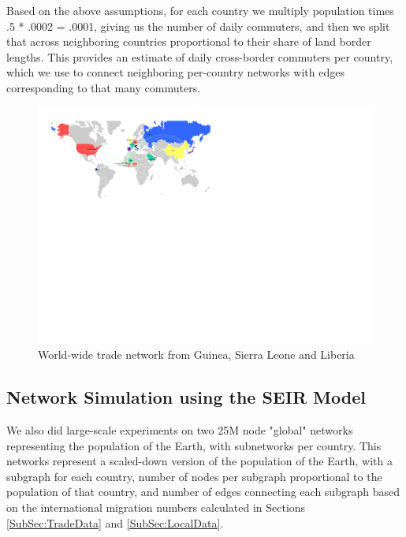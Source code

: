 \documentclass[10pt, journal,onecolumn]{IEEEtran}
\begin{document}
Based on the above assumptions, for each country we multiply population times .5 * .0002
= .0001, giving us the number of daily commuters, and then we split that across neighboring
countries proportional to their share of land border lengths. This provides an estimate
of daily cross-border commuters per country, which we use to connect neighboring per-country
networks with edges corresponding to that many commuters.


\begin{figure}[ht]
\centering
\includegraphics[scale=1.1]{world1.pdf}
\caption{World-wide trade network from Guinea, Sierra Leone and Liberia}
\label{Fig:worldtrade}
\end{figure}


\subsection{{Network Simulation using the SEIR Model}}
\label{SubSec:GraphX}

We also did large-scale experiments on two 25M node "global" networks representing the population
of the Earth, with subnetworks per country. This networks represent a scaled-down version of the
population of the Earth, with a subgraph for each country, number of nodes per subgraph proportional
to the population of that country, and number of edges connecting each subgraph based on the
international migration numbers calculated in Sections \ref{SubSec:TradeData} and \ref{SubSec:LocalData}.
\end{document}
